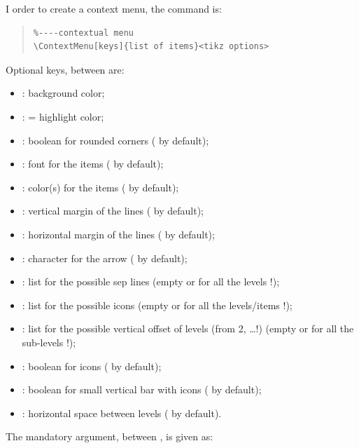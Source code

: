 \documentclass[11pt,a4paper]{ltxdoc}
\begin{document}
I order to create a context menu, the command is:

\begin{quote}
\begin{verbatim}
%----contextual menu
\ContextMenu[keys]{list of items}<tikz options>
\end{verbatim}
\end{quote}

Optional keys, between \MontreCode{[...]} are:

\begin{itemize}
	\item {}: background color;
	\item {}: = highlight color;
	\item {}: boolean for rounded corners ( by default);
	\item {}: font for the items ( by default);
	\item {}: color(s) for the items ( by default);
	\item {}: vertical margin of the lines (\MontreCode{6pt} by default);
	\item {}: horizontal margin of the lines (\MontreCode{12pt} by default);
	\item {}: character for the arrow ( by default);
	\item {}: list for the possible sep lines (empty or for all the levels !);
	\item {}: list for the possible icons (empty or for all the levels/items !);
	\item {}: list for the possible vertical offset of levels (from 2, \ldots !) (empty or for all the sub-levels !);
	\item {}: boolean for icons ( by default);
	\item {}: boolean for small vertical bar with icons ( by default);
	\item {}: horizontal space between levels ( by default).
\end{itemize}

\medskip

The mandatory argument, between , is given as:
\end{document}
